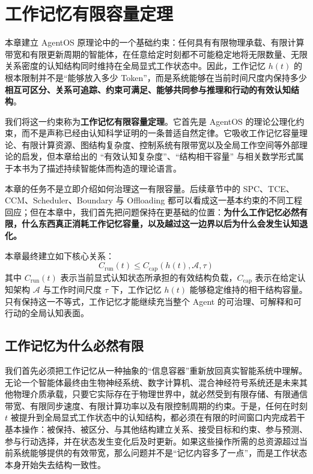 \chapter{工作记忆有限容量定理}
\label{chap:working-memory-finite-capacity}

\begin{chapterlead}
本章建立 AgentOS 原理论中的一个基础约束：任何具有有限物理承载、有限计算带宽和有限更新周期的智能体，在任意给定时刻都不可能稳定地将无限数量、无限关系密度的认知结构同时维持在全局显式工作状态中。因此，工作记忆 $h(t)$ 的根本限制并不是“能够放入多少 Token”，而是系统能够在当前时间尺度内保持多少\textbf{相互可区分、关系可追踪、约束可满足、能够共同参与推理和行动的有效认知结构}。

我们将这一约束称为\textbf{工作记忆有限容量定理}。它首先是 AgentOS 的理论公理化约束，而不是声称已经由认知科学证明的一条普适自然定律。它吸收工作记忆容量理论、有限计算资源、图结构复杂度、控制系统有限带宽以及全局工作空间等外部理论的启发，但本章给出的 ``有效认知复杂度''、``结构相干容量'' 与相关数学形式属于本书为了描述持续智能体而构造的理论语言。

本章的任务不是立即介绍如何治理这一有限容量。后续章节中的 SPC、TCE、CCM、Scheduler、Boundary 与 Offloading 都可以看成这一基本约束的不同工程回应；但在本章中，我们首先把问题保持在更基础的位置：\textbf{为什么工作记忆必然有限，什么东西真正消耗工作记忆容量，以及越过这一边界以后为什么会发生认知退化。}

本章最终建立如下核心关系：
\[
\boxed{
C_{\mathrm{run}}(t)
\leq
C_{\mathrm{cap}}\!\left(h(t),\mathcal{A},\tau\right)
}
\]
其中 $C_{\mathrm{run}}(t)$ 表示当前显式认知状态所承担的有效结构负载，$C_{\mathrm{cap}}$ 表示在给定认知架构 $\mathcal{A}$ 与工作时间尺度 $\tau$ 下，工作记忆 $h(t)$ 能够稳定维持的相干结构容量。只有保持这一不等式，工作记忆才能继续充当整个 Agent 的可治理、可解释和可行动的全局认知表面。
\end{chapterlead}


\section{工作记忆为什么必然有限}
\label{sec:wm-why-finite}

我们首先必须把工作记忆从一种抽象的“信息容器”重新放回真实智能系统中理解。无论一个智能体最终由生物神经系统、数字计算机、混合神经符号系统还是未来其他物理介质承载，只要它实际存在于物理世界中，就必然受到有限存储、有限通信带宽、有限同步速度、有限计算功率以及有限控制周期的约束。于是，任何在时刻 $t$ 被提升到全局显式工作状态中的认知结构，都必须在有限的时间窗口内完成若干基本操作：被保持、被区分、与其他结构建立关系、接受目标和约束、参与预测、参与行动选择，并在状态发生变化后及时更新。如果这些操作所需的总资源超过当前系统能够提供的有效带宽，那么问题并不是“记忆内容多了一点”，而是工作状态本身开始失去结构一致性。

